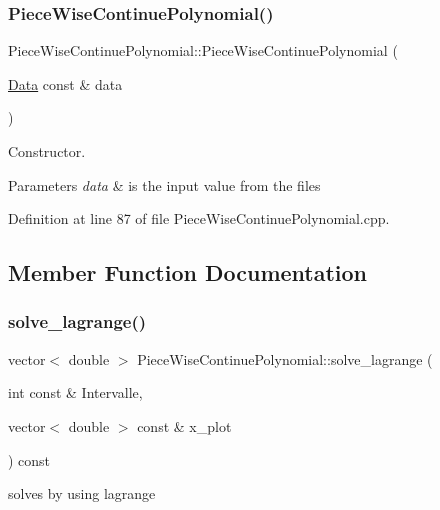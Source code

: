 \subsubsection{\texorpdfstring{Piece\+Wise\+Continue\+Polynomial()}{PieceWiseContinuePolynomial()}}
{\footnotesize\ttfamily Piece\+Wise\+Continue\+Polynomial\+::\+Piece\+Wise\+Continue\+Polynomial (\begin{DoxyParamCaption}\item[{\mbox{\hyperlink{struct_data}{Data}} const \&}]{data }\end{DoxyParamCaption})\hspace{0.3cm}{\ttfamily [explicit]}}



Constructor. 


\begin{DoxyParams}{Parameters}
{\em data} & is the input value from the files \\
\hline
\end{DoxyParams}


Definition at line 87 of file Piece\+Wise\+Continue\+Polynomial.\+cpp.



\subsection{Member Function Documentation}
\mbox{\label{class_piece_wise_continue_polynomial_a19731122369c27f68802687e7d64aaf5}} 
\subsubsection{\texorpdfstring{solve\+\_\+lagrange()}{solve\_lagrange()}}
{\footnotesize\ttfamily vector$<$ double $>$ Piece\+Wise\+Continue\+Polynomial\+::solve\+\_\+lagrange (\begin{DoxyParamCaption}\item[{int const \&}]{Intervalle,  }\item[{vector$<$ double $>$ const \&}]{x\+\_\+plot }\end{DoxyParamCaption}) const}



solves by using lagrange 


